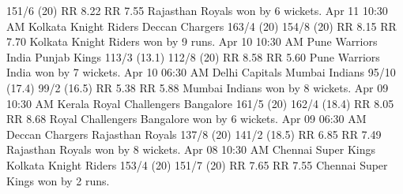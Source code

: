 151/6 (20)
RR 8.22
RR 7.55
Rajasthan Royals won by 6 wickets.
Apr 11
10:30 AM
Kolkata Knight Riders
Deccan Chargers
163/4 (20)
154/8 (20)
RR 8.15
RR 7.70
Kolkata Knight Riders won by 9 runs.
Apr 10
10:30 AM
Pune Warriors India
Punjab Kings
113/3 (13.1)
112/8 (20)
RR 8.58
RR 5.60
Pune Warriors India won by 7 wickets.
Apr 10
06:30 AM
Delhi Capitals
Mumbai Indians
95/10 (17.4)
99/2 (16.5)
RR 5.38
RR 5.88
Mumbai Indians won by 8 wickets.
Apr 09
10:30 AM
Kerala
Royal Challengers Bangalore
161/5 (20)
162/4 (18.4)
RR 8.05
RR 8.68
Royal Challengers Bangalore won by 6 wickets.
Apr 09
06:30 AM
Deccan Chargers
Rajasthan Royals
137/8 (20)
141/2 (18.5)
RR 6.85
RR 7.49
Rajasthan Royals won by 8 wickets.
Apr 08
10:30 AM
Chennai Super Kings
Kolkata Knight Riders
153/4 (20)
151/7 (20)
RR 7.65
RR 7.55
Chennai Super Kings won by 2 runs.